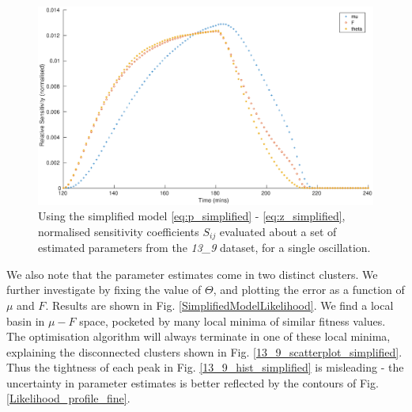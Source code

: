 \documentclass[10pt,journal]{./IEEE_latex_class/IEEEtran}
\begin{document}
 
\begin{figure}[h]
\centering
\includegraphics[scale = 0.23,clip = true, trim = 90 0 60 0]{Sensitivity_scaled_simplified}
\caption{Using the simplified model \eqref{eq:p_simplified} - \eqref{eq:z_simplified}, normalised sensitivity coefficients $S_{ij}$ evaluated about a set of estimated parameters from the \textit{13\_9} dataset, for a single oscillation.}
\label{Sensitivity_scaled_simplified}
\end{figure}
 
 We also note that the parameter estimates come in two distinct clusters.  We further investigate by fixing the value of $\Theta$, and plotting the error as a function of $\mu$ and $F$. Results are shown in Fig. \ref{SimplifiedModelLikelihood}. We find a local basin in $ \mu - F$ space, pocketed by many local minima of similar fitness values. The optimisation algorithm will always terminate in one of these local minima, explaining the disconnected clusters shown in Fig.  \ref{13_9_scatterplot_simplified}. Thus the tightness of each peak in Fig. \ref{13_9_hist_simplified} is misleading - the uncertainty in parameter estimates is better reflected by the contours of Fig. \ref{Likelihood_profile_fine}.
 
\end{document}
